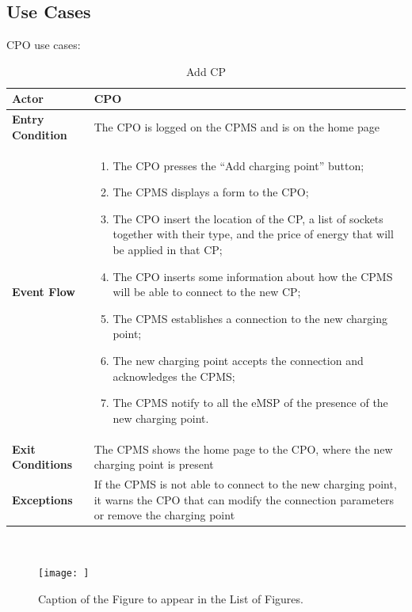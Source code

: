 \documentclass{Configuration_Files/PoliMi3i_thesis}
\begin{document}
\subsection{Use Cases}
CPO use cases:


\begin{table}[H]
    \begin{tabularx}{\textwidth}{| >{\columncolor{bluepoli!40}}l | X |}
    \hline
    \textbf{Actor} & CPO\T\B \\
    \hline
    \textbf{Entry Condition} & The CPO is logged on the CPMS and is on the home page\T\B\\
    \hline
    \textbf{Event Flow} & 
        \begin{enumerate}
        \item The CPO presses the “Add charging point” button;
        \item The CPMS displays a form to the CPO;
        \item The CPO insert the location of the CP, a list of sockets together with their type, and the price of energy that will be applied in that CP;
        \item The CPO inserts some information about how the CPMS will be able to connect to the new CP;
        \item The CPMS establishes a connection to the new charging point;
        \item The new charging point accepts the connection and acknowledges the CPMS;
        \item The CPMS notify to all the eMSP of the presence of the new charging point.
        \end{enumerate}\B\\
    \hline
    \textbf{Exit Conditions} & The CPMS shows the home page to the CPO, where the new charging point is present\B\\
    \hline
    \textbf{Exceptions} & If the CPMS is not able to connect to the new charging point, it warns the CPO that can modify the connection parameters or remove the charging point\B\\
    \hline
    \end{tabularx}
    \\[10pt]
    \caption{Add CP}
    \label{table:example}
\end{table}

\begin{figure}[H]
    \centering
    \texttt{[image: ]}
    \caption{Caption of the Figure to appear in the List of Figures.}
    \label{fig:quadtree}
\end{figure}
\end{document}
